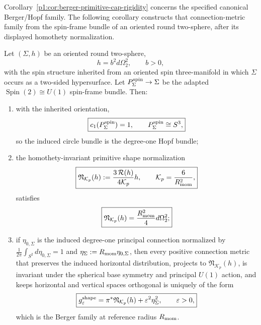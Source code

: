 \documentclass[11pt]{article}
\begin{document}
\begin{remark}
\label{p1:rem:berger-primitive-cap-scope}
Corollary~\ref{p1:cor:berger-primitive-cap-rigidity} concerns the specified
canonical Berger/Hopf family.  The following corollary constructs that
connection-metric family from the spin-frame bundle of an oriented round
two-sphere, after its displayed homothety normalization.
\end{remark}

\begin{corollary}
\label{p1:cor:spinframe-hopf-shape-descendant}
Let \((\Sigma,h)\) be an oriented round two-sphere,
\[
 h=b^2d\Omega_2^2,\qquad b>0,
\]
with the spin structure inherited from an oriented spin three-manifold in which
\(\Sigma\) occurs as a two-sided hypersurface.  Let
\(P^{\rm spin}_{\Sigma}\to\Sigma\) be the adapted
\(\operatorname{Spin}(2)\cong U(1)\) spin-frame bundle.  Then:
\begin{enumerate}
\item with the inherited orientation,
\[
 \boxed{c_1(P^{\rm spin}_{\Sigma})=1,\qquad
        P^{\rm spin}_{\Sigma}\cong S^3,}
\]
so the induced circle bundle is the degree-one Hopf bundle;
\item the homothety-invariant primitive shape normalization
\begin{equation}
\label{p1:eq:primitive-shape-normalization}
 \boxed{
 \mathfrak N_{\mathcal K_p}(h)
 :=\frac{3\,\mathcal R(h)}{4\mathcal K_p}h,\qquad
 \mathcal K_p=\frac6{R_{\mathrm{mom}}^2},}
\end{equation}
satisfies
\[
 \boxed{\mathfrak N_{\mathcal K_p}(h)
 =\frac{R_{\mathrm{mom}}^2}{4}d\Omega_2^2;}
\]
\item if \(\eta_{0,\Sigma}\) is the induced degree-one principal
connection normalized by
\(\frac1{2\pi}\int_{S^2}d\eta_{0,\Sigma}=1\) and
\(\eta_{\Sigma}:=R_{\mathrm{mom}}\eta_{0,\Sigma}\), then every positive
connection metric that preserves the induced horizontal distribution, projects
to \(\mathfrak N_{\mathcal K_p}(h)\), is invariant under the spherical
base symmetry and principal \(U(1)\) action, and keeps horizontal and vertical
spaces orthogonal is uniquely of the form
\begin{equation}
\label{p1:eq:spinframe-berger-shape-family}
 \boxed{
 g_{\varepsilon}^{\rm shape}
 =\pi^*\mathfrak N_{\mathcal K_p}(h)
 +\varepsilon^2\eta_{\Sigma}^2,\qquad \varepsilon>0,}
\end{equation}
which is the Berger family at reference radius \(R_{\mathrm{mom}}\).
\end{enumerate}
\end{corollary}
\end{document}
